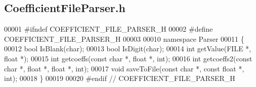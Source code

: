 \subsection{Coefficient\+File\+Parser.\+h}
\label{CoefficientFileParser_8h_source}

\begin{DoxyCode}
00001 \textcolor{preprocessor}{#ifndef COEFFICIENT\_FILE\_PARSER\_H}
00002 \textcolor{preprocessor}{#define COEFFICIENT\_FILE\_PARSER\_H}
00003 
00010 \textcolor{keyword}{namespace }Parser
00011 \{
00012     \textcolor{keywordtype}{bool} IsBlank(\textcolor{keywordtype}{char});
00013     \textcolor{keywordtype}{bool} IsDigit(\textcolor{keywordtype}{char});
00014     \textcolor{keywordtype}{int} getValue(FILE *, \textcolor{keywordtype}{float} *);
00015     \textcolor{keywordtype}{int} getcoeffs(\textcolor{keyword}{const} \textcolor{keywordtype}{char} *, \textcolor{keywordtype}{float} *, \textcolor{keywordtype}{int});
00016     \textcolor{keywordtype}{int} getcoeffs2(\textcolor{keyword}{const} \textcolor{keywordtype}{char} *, \textcolor{keywordtype}{float} *, \textcolor{keywordtype}{float} *, \textcolor{keywordtype}{int});
00017     \textcolor{keywordtype}{void} saveToFile(\textcolor{keyword}{const} \textcolor{keywordtype}{char} *, \textcolor{keyword}{const} \textcolor{keywordtype}{float} *, \textcolor{keywordtype}{int});
00018 \}
00019 
00020 \textcolor{preprocessor}{#endif // COEFFICIENT\_FILE\_PARSER\_H}
\end{DoxyCode}
